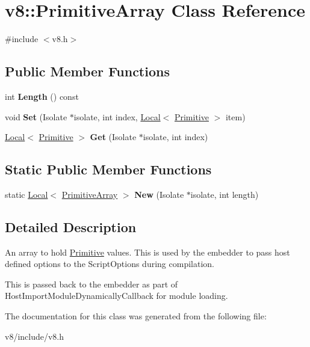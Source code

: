 \hypertarget{classv8_1_1PrimitiveArray}{}\section{v8\+:\+:Primitive\+Array Class Reference}
\label{classv8_1_1PrimitiveArray}


{\ttfamily \#include $<$v8.\+h$>$}

\subsection*{Public Member Functions}
\begin{DoxyCompactItemize}
\item 
\mbox{\label{classv8_1_1PrimitiveArray_a7e51b026e03b0a4ab3c3bec4676dfd9e}} 
int {\bfseries Length} () const
\item 
\mbox{\label{classv8_1_1PrimitiveArray_af857e95d15c32fdab2e48b8e202a7dfb}} 
void {\bfseries Set} (Isolate $\ast$isolate, int index, \mbox{\hyperlink{classv8_1_1Local}{Local}}$<$ \mbox{\hyperlink{classv8_1_1Primitive}{Primitive}} $>$ item)
\item 
\mbox{\label{classv8_1_1PrimitiveArray_a17adb353f475bdfcb579250389c7bff1}} 
\mbox{\hyperlink{classv8_1_1Local}{Local}}$<$ \mbox{\hyperlink{classv8_1_1Primitive}{Primitive}} $>$ {\bfseries Get} (Isolate $\ast$isolate, int index)
\end{DoxyCompactItemize}
\subsection*{Static Public Member Functions}
\begin{DoxyCompactItemize}
\item 
\mbox{\label{classv8_1_1PrimitiveArray_afdb183e117929fa286e0311c51ff8693}} 
static \mbox{\hyperlink{classv8_1_1Local}{Local}}$<$ \mbox{\hyperlink{classv8_1_1PrimitiveArray}{Primitive\+Array}} $>$ {\bfseries New} (Isolate $\ast$isolate, int length)
\end{DoxyCompactItemize}


\subsection{Detailed Description}
An array to hold \mbox{\hyperlink{classv8_1_1Primitive}{Primitive}} values. This is used by the embedder to pass host defined options to the Script\+Options during compilation.

This is passed back to the embedder as part of Host\+Import\+Module\+Dynamically\+Callback for module loading. 

The documentation for this class was generated from the following file\+:\begin{DoxyCompactItemize}
\item 
v8/include/v8.\+h\end{DoxyCompactItemize}
